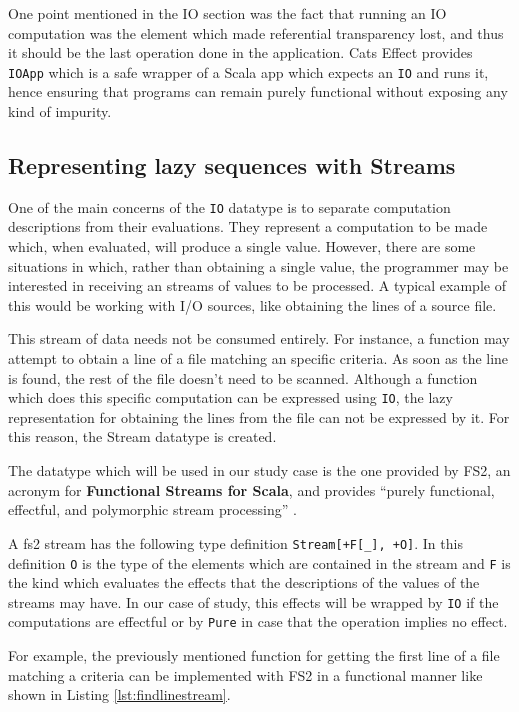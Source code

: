 \documentclass[../main.tex]{subfiles}
\begin{document}
One point mentioned in the IO section was the fact that running an IO computation was the
element which made referential transparency lost, and thus it should be the last
operation done in the application. Cats Effect provides \texttt{IOApp} which is
a safe wrapper of a Scala app which expects an \texttt{IO} and runs it, hence ensuring
that programs can remain purely functional without exposing any kind of impurity.

\subsection{Representing lazy sequences with Streams}
One of the main concerns of the \texttt{IO} datatype is to separate computation
descriptions from their evaluations. They represent a computation to be
made which, when evaluated, will produce a single value. However, there are some
situations in which, rather than obtaining a single value, the programmer may be
interested in receiving an streams of values to be processed. A typical example
of this would be working with I/O sources, like obtaining the lines of a source
file.

This stream of data needs not be consumed entirely. For instance, a function may attempt to
obtain a line of a file matching an specific criteria. As soon as the line is
found, the rest of the file doesn't need to be scanned. Although a function which does
this specific computation can be expressed using \texttt{IO}, the lazy
representation for obtaining the lines from the file can not be expressed by it. For this
reason, the Stream datatype is created.

The datatype which will be used in our study case is the one provided by FS2, 
an acronym for \textbf{Functional Streams for Scala}, and provides ``purely
functional, effectful, and polymorphic stream processing'' \autocite{Fs2:Home}.

A fs2 stream has the following type definition \texttt{Stream[+F[\_], +O]}. In
this definition \texttt{O} is the type of the elements which are contained in
the stream and \texttt{F} is the kind which evaluates the effects that the
descriptions of the values of the streams may have. In our case of study, this
effects will be wrapped by \texttt{IO} if the computations are effectful or by
\texttt{Pure} in case that the operation implies no effect.

For example, the previously mentioned function for getting the first line of a
file matching a criteria can be implemented with FS2 in a functional manner like
shown in Listing \ref{lst:findlinestream}.
\end{document}
